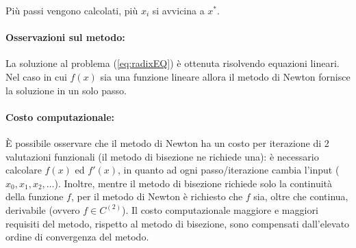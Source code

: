 Più passi vengono calcolati, più $x_i$ si avvicina a $x^*$.

\paragraph{Osservazioni sul metodo:} La soluzione al problema (\ref{eq:radixEQ}) è ottenuta risolvendo \gls{equazioni lineari}. Nel caso in cui $f(x)$ sia una \gls{funzione lineare} allora il metodo di Newton fornisce la soluzione in un solo passo.

\paragraph{Costo computazionale:}È possibile osservare che il metodo di Newton ha un costo per iterazione di 2 valutazioni funzionali (il metodo di bisezione ne richiede una): è necessario calcolare $f(x)$ ed $f'(x)$, in quanto ad ogni passo/iterazione cambia l'input ($x_0, x_1, x_2, \hdots$).
Inoltre, mentre il metodo di bisezione richiede solo la continuità della funzione $f$, per il metodo di Newton è richiesto che $f$ sia, oltre che continua, derivabile (ovvero $f\in C^{(2)}$).
Il costo computazionale maggiore e maggiori requisiti del metodo, rispetto al metodo di bisezione, sono compensati dall'elevato ordine di convergenza del metodo.

